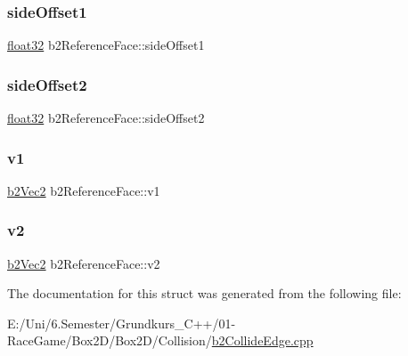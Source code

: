 \mbox{\label{structb2_reference_face_a7e2a902ed8f499fbb4305d51ce687876}} 
\subsubsection{\texorpdfstring{sideOffset1}{sideOffset1}}
{\footnotesize\ttfamily \mbox{\hyperlink{b2_settings_8h_aacdc525d6f7bddb3ae95d5c311bd06a1}{float32}} b2\+Reference\+Face\+::side\+Offset1}

\mbox{\label{structb2_reference_face_a7fa70d9f4bfc4cdf792408ffe204d017}} 
\subsubsection{\texorpdfstring{sideOffset2}{sideOffset2}}
{\footnotesize\ttfamily \mbox{\hyperlink{b2_settings_8h_aacdc525d6f7bddb3ae95d5c311bd06a1}{float32}} b2\+Reference\+Face\+::side\+Offset2}

\mbox{\label{structb2_reference_face_a20165b58f2e81b78ed3a099ef85737ac}} 
\subsubsection{\texorpdfstring{v1}{v1}}
{\footnotesize\ttfamily \mbox{\hyperlink{structb2_vec2}{b2\+Vec2}} b2\+Reference\+Face\+::v1}

\mbox{\label{structb2_reference_face_aa89eb5b51e9ee680b97c33041658f9ab}} 
\subsubsection{\texorpdfstring{v2}{v2}}
{\footnotesize\ttfamily \mbox{\hyperlink{structb2_vec2}{b2\+Vec2}} b2\+Reference\+Face\+::v2}



The documentation for this struct was generated from the following file\+:\begin{DoxyCompactItemize}
\item 
E\+:/\+Uni/6.\+Semester/\+Grundkurs\+\_\+\+C++/01-\/\+Race\+Game/\+Box2\+D/\+Box2\+D/\+Collision/\mbox{\hyperlink{b2_collide_edge_8cpp}{b2\+Collide\+Edge.\+cpp}}\end{DoxyCompactItemize}
